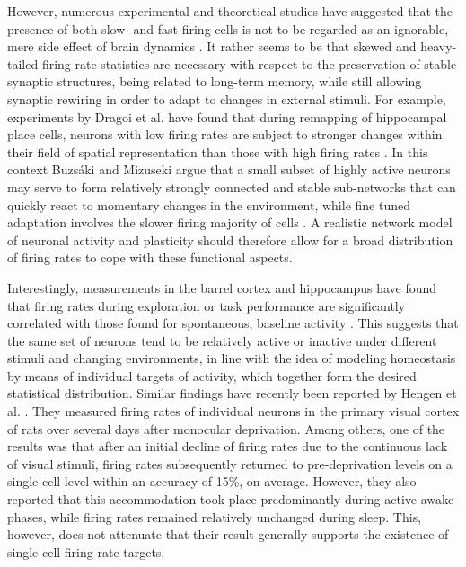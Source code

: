 \documentclass[10pt,a4paper]{article}
\begin{document}
However, numerous experimental and theoretical studies have suggested that the presence of both slow- and fast-firing cells is not to be regarded as an ignorable, mere side effect of brain dynamics \cite{Buzsaki_2004,Marsat_2010,Tripathy_2013}. It rather seems to be that skewed and heavy-tailed firing rate statistics are necessary with respect to the preservation of stable synaptic structures, being related to long-term memory, while still allowing synaptic rewiring in order to adapt to changes in external stimuli. For example, experiments by Dragoi et al. have found that during remapping of hippocampal place cells, neurons with low firing rates are subject to stronger changes within their field of spatial representation than those with high firing rates \cite{Dragoi_2003}. In this context Buzsáki and Mizuseki argue that a small subset of highly active neurons may serve to form relatively strongly connected and stable sub-networks that can quickly react to momentary changes in the environment, while fine tuned adaptation involves the slower firing majority of cells \cite{Buzsaki_Fir_Rates_2014}. A realistic network model of neuronal activity and plasticity should therefore allow for a broad distribution of firing rates to cope with these functional aspects. 

Interestingly, measurements in the barrel cortex and hippocampus have found that firing rates during exploration or task performance are significantly correlated with those found for spontaneous, baseline activity \cite{OConnor_2010,Mizuseki_2013}. This suggests that the same set of neurons tend to be relatively active or inactive under different stimuli and changing environments, in line with the idea of modeling homeostasis by means of individual targets of activity, which together form the desired statistical distribution. Similar findings have recently been reported by Hengen et al. \cite{Hengen_2016}. They measured firing rates of individual neurons in the primary visual cortex of rats over several days after monocular deprivation. Among others, one of the results was that after an initial decline of firing rates due to the continuous lack of visual stimuli, firing rates subsequently returned to pre-deprivation levels on a single-cell level within an accuracy of 15\%, on average. However, they also reported that this accommodation took place predominantly during active awake phases, while firing rates remained relatively unchanged during sleep. This, however, does not attenuate that their result generally supports the existence of single-cell firing rate targets.
\end{document}
